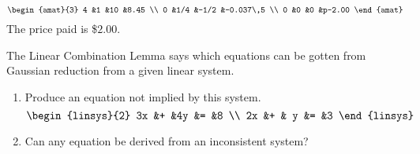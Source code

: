 \begin{exercises}
\begin{answer}
\begin{equation*}
\begin{amat}{3}
         4  &1    &10     &8.45      \\
         0  &1/4  &-1/2   &-0.037\,5 \\
         0  &0    &0      &p-2.00
       \end{amat}
     \end{equation*}
     The price paid is \$$2.00$.
   \end{answer}
  \recommended \item 
   The Linear Combination Lemma says which equations can be gotten from
   Gaussian reduction from a given linear system.
   \begin{enumerate}
     \item Produce an equation not implied by this system.
       \begin{equation*}
         \begin{linsys}{2}
           3x  &+  &4y  &=  &8 \\
           2x  &+  & y  &=  &3 
         \end{linsys}
       \end{equation*}
     \item Can any equation be derived from an inconsistent system?
   \end{enumerate}

\end{exercises}
